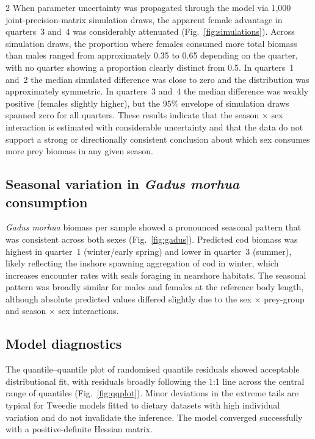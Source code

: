 \begin{spacing}{2}
When parameter uncertainty was propagated through the model via 1,000
joint-precision-matrix simulation draws, the apparent female advantage in
quarters~3 and~4 was considerably attenuated (Fig.~\ref{fig:simulations}).
Across simulation draws, the proportion where females consumed more total
biomass than males ranged from approximately 0.35 to 0.65 depending on the
quarter, with no quarter showing a proportion clearly distinct from 0.5.
In quarters~1 and~2 the median simulated difference was close to zero and
the distribution was approximately symmetric. In quarters~3 and~4 the median
difference was weakly positive (females slightly higher), but the 95\%
envelope of simulation draws spanned zero for all quarters. These results
indicate that the season $\times$ sex interaction is estimated with
considerable uncertainty and that the data do not support a strong or
directionally consistent conclusion about which sex consumes more prey
biomass in any given season.

\subsection{Seasonal variation in \textit{Gadus morhua} consumption}

\textit{Gadus morhua} biomass per sample showed a pronounced seasonal
pattern that was consistent across both sexes (Fig.~\ref{fig:gadus}).
Predicted cod biomass was highest in quarter~1 (winter/early spring) and
lower in quarter~3 (summer), likely reflecting the inshore spawning
aggregation of cod in winter, which increases encounter rates with seals
foraging in nearshore habitats. The seasonal pattern was broadly similar for
males and females at the reference body length, although absolute predicted
values differed slightly due to the sex $\times$ prey-group and season
$\times$ sex interactions.

\subsection{Model diagnostics}

The quantile--quantile plot of randomised quantile residuals showed
acceptable distributional fit, with residuals broadly following the 1:1 line
across the central range of quantiles (Fig.~\ref{fig:qqplot}). Minor
deviations in the extreme tails are typical for Tweedie models fitted to
dietary datasets with high individual variation and do not invalidate the
inference. The model converged successfully with a positive-definite Hessian
matrix.


\end{spacing}
